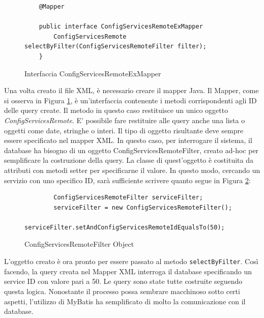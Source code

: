 \begin{figure}[H]
    \begin{verbatim}
    @Mapper

    public interface ConfigServicesRemoteExMapper 
        ConfigServicesRemote selectByFilter(ConfigServicesRemoteFilter filter);
    }    
    \end{verbatim}
    \caption{Interfaccia ConfigServicesRemoteExMapper}
    \label{fig:mybatismapperinterface}
\end{figure}
Una volta creato il file XML, è necessario creare il mapper Java. Il Mapper, come si osserva in Figura \ref{fig:mybatismapperinterface}, è un'interfaccia contenente i metodi corrispondenti agli ID delle query create. Il metodo in questo caso restituisce un unico oggetto \textit{ConfigServicesRemote}. E' possibile fare restituire alle query anche una lista o oggetti come date, stringhe o interi. Il tipo di oggetto risultante deve sempre essere specificato nel mapper XML. In questo caso, per interrogare il sistema, il database ha bisogno di un oggetto ConfigServicesRemoteFilter, creato ad-hoc per semplificare la costruzione della query. La classe di quest'oggetto è costituita da attributi con metodi setter per specificarne il valore. In questo modo, cercando un servizio con uno specifico ID, sarà sufficiente scrivere quanto segue in Figura \ref{fig:filterobject}:

\begin{figure}
    \begin{verbatim}
        ConfigServicesRemoteFilter serviceFilter; 
        serviceFilter = new ConfigServicesRemoteFilter();
        serviceFilter.setAndConfigServicesRemoteIdEqualsTo(50);
    \end{verbatim}
    \caption{ConfigServicesRemoteFilter Object}
    \label{fig:filterobject}
\end{figure}

L'oggetto creato è ora pronto per essere passato al metodo \texttt{selectByFilter}. Così facendo, la query creata nel Mapper XML interroga il database specificando un service ID con valore pari a 50. Le query sono state tutte costruite seguendo questa logica. Nonostante il processo possa sembrare macchinoso sotto certi aspetti, l'utilizzo di MyBatis ha semplificato di molto la comunicazione con il database.

